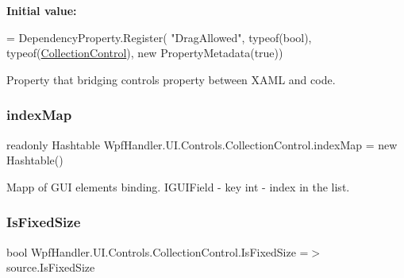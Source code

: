 {\bfseries Initial value\+:}
\begin{DoxyCode}
= DependencyProperty.Register(
          \textcolor{stringliteral}{"DragAllowed"}, typeof(\textcolor{keywordtype}{bool}), typeof(\mbox{\hyperlink{class_wpf_handler_1_1_u_i_1_1_controls_1_1_collection_control_a5228b3f2d5efec75b178a160bfd9a558}{CollectionControl}}),
          \textcolor{keyword}{new} PropertyMetadata(\textcolor{keyword}{true}))
\end{DoxyCode}


Property that bridging control\textquotesingle{}s property between X\+A\+ML and code. 

\mbox{\label{class_wpf_handler_1_1_u_i_1_1_controls_1_1_collection_control_af3a8d4c03474bbb80d8d461f4a8e33e8}} 
\subsubsection{\texorpdfstring{index\+Map}{indexMap}}
{\footnotesize\ttfamily readonly Hashtable Wpf\+Handler.\+U\+I.\+Controls.\+Collection\+Control.\+index\+Map = new Hashtable()\hspace{0.3cm}{\ttfamily [protected]}}



Mapp of G\+UI elements binding. I\+G\+U\+I\+Field -\/ key int -\/ index in the list. 

\mbox{\label{class_wpf_handler_1_1_u_i_1_1_controls_1_1_collection_control_aa95fcae30ed2356bfff8154bcceecc8a}} 
\subsubsection{\texorpdfstring{Is\+Fixed\+Size}{IsFixedSize}}
{\footnotesize\ttfamily bool Wpf\+Handler.\+U\+I.\+Controls.\+Collection\+Control.\+Is\+Fixed\+Size =$>$ source.\+Is\+Fixed\+Size}



